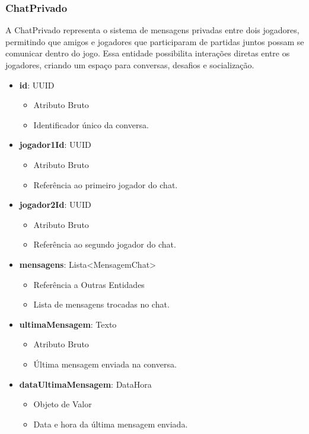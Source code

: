     \subsubsection{ChatPrivado}
    A ChatPrivado representa o sistema de mensagens privadas entre dois jogadores, permitindo que amigos e jogadores que participaram de partidas juntos possam se comunicar dentro do jogo. Essa entidade possibilita interações diretas entre os jogadores, criando um espaço para conversas, desafios e socialização.
    \begin{itemize}
        \item \textbf{id}: UUID  
              \begin{itemize}
                  \item Atributo Bruto
                  \item Identificador único da conversa.
              \end{itemize}
    
        \item \textbf{jogador1Id}: UUID  
              \begin{itemize}
                  \item Atributo Bruto
                  \item Referência ao primeiro jogador do chat.
              \end{itemize}
    
        \item \textbf{jogador2Id}: UUID  
              \begin{itemize}
                  \item Atributo Bruto
                  \item Referência ao segundo jogador do chat.
              \end{itemize}
    
        \item \textbf{mensagens}: Lista<MensagemChat>  
              \begin{itemize}
                  \item Referência a Outras Entidades
                  \item Lista de mensagens trocadas no chat.
              \end{itemize}
    
        \item \textbf{ultimaMensagem}: Texto  
              \begin{itemize}
                  \item Atributo Bruto
                  \item Última mensagem enviada na conversa.
              \end{itemize}
    
        \item \textbf{dataUltimaMensagem}: DataHora  
              \begin{itemize}
                  \item Objeto de Valor
                  \item Data e hora da última mensagem enviada.
              \end{itemize}
    \end{itemize}

